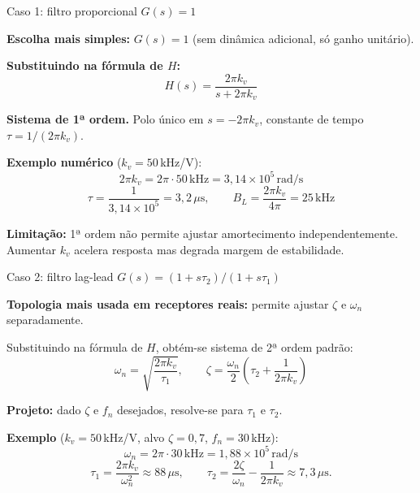 
\begin{frame}{Caso 1: filtro proporcional $G(s) = 1$}

\textbf{Escolha mais simples:} $G(s) = 1$ (sem dinâmica adicional, só ganho unitário).

\pause
\textbf{Substituindo na fórmula de $H$:}
\[
H(s) = \frac{2\pi k_v}{s + 2\pi k_v}
\]

\textbf{Sistema de 1ª ordem.} Polo único em $s = -2\pi k_v$, constante de tempo $\tau = 1/(2\pi k_v)$.

\pause
\vspace{0.3cm}
\textbf{Exemplo numérico} ($k_v = 50$\,kHz/V):
\[
2\pi k_v = 2\pi\cdot 50\,\text{kHz} = 3{,}14\!\times\!10^5\,\text{rad/s}
\]
\[
\tau = \frac{1}{3{,}14\!\times\!10^5} = 3{,}2\,\mu\text{s}, \qquad B_L = \frac{2\pi k_v}{4\pi} = 25\,\text{kHz}
\]

\pause
\textbf{Limitação:} 1ª ordem não permite ajustar amortecimento independentemente. Aumentar $k_v$ acelera resposta mas degrada margem de estabilidade.

\end{frame}


\begin{frame}{Caso 2: filtro lag-lead $G(s) = (1 + s\tau_2)/(1 + s\tau_1)$}

\textbf{Topologia mais usada em receptores reais:} permite ajustar $\zeta$ e $\omega_n$ separadamente.

\pause
\vspace{0.2cm}
Substituindo na fórmula de $H$, obtém-se sistema de 2ª ordem padrão:
\[
\omega_n = \sqrt{\dfrac{2\pi k_v}{\tau_1}}, \qquad
\zeta = \dfrac{\omega_n}{2}\!\left(\tau_2 + \dfrac{1}{2\pi k_v}\right)
\]

\pause
\vspace{0.3cm}
\textbf{Projeto:} dado $\zeta$ e $f_n$ desejados, resolve-se para $\tau_1$ e $\tau_2$.

\pause
\vspace{0.2cm}
\textbf{Exemplo} ($k_v = 50$\,kHz/V, alvo $\zeta = 0{,}7$, $f_n = 30$\,kHz):
\[
\omega_n = 2\pi\cdot 30\,\text{kHz} = 1{,}88\!\times\!10^5\,\text{rad/s}
\]
\[
\tau_1 = \frac{2\pi k_v}{\omega_n^2} \approx 88\,\mu\text{s}, \qquad
\tau_2 = \frac{2\zeta}{\omega_n} - \frac{1}{2\pi k_v} \approx 7{,}3\,\mu\text{s}.
\]

\end{frame}

